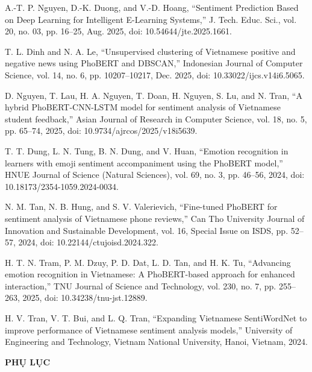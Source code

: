 \documentclass[14pt, a4paper]{report}
\begin{document}
\begin{enumerate}[label={[\arabic*]}]
    \item A.-T. P. Nguyen, D.-K. Duong, and V.-D. Hoang, ``Sentiment Prediction Based on Deep Learning for Intelligent E-Learning Systems,'' J. Tech. Educ. Sci., vol. 20, no. 03, pp. 16--25, Aug. 2025, doi: 10.54644/jte.2025.1661.

    \item T. L. Dinh and N. A. Le, ``Unsupervised clustering of Vietnamese positive and negative news using PhoBERT and DBSCAN,'' Indonesian Journal of Computer Science, vol. 14, no. 6, pp. 10207--10217, Dec. 2025, doi: 10.33022/ijcs.v14i6.5065.

    \item D. Nguyen, T. Lau, H. A. Nguyen, T. Doan, H. Nguyen, S. Lu, and N. Tran, ``A hybrid PhoBERT-CNN-LSTM model for sentiment analysis of Vietnamese student feedback,'' Asian Journal of Research in Computer Science, vol. 18, no. 5, pp. 65--74, 2025, doi: 10.9734/ajrcos/2025/v18i5639.

    \item T. T. Dung, L. N. Tung, B. N. Dung, and V. Huan, ``Emotion recognition in learners with emoji sentiment accompaniment using the PhoBERT model,'' HNUE Journal of Science (Natural Sciences), vol. 69, no. 3, pp. 46--56, 2024, doi: 10.18173/2354-1059.2024-0034.

    \item N. M. Tan, N. B. Hung, and S. V. Valerievich, ``Fine-tuned PhoBERT for sentiment analysis of Vietnamese phone reviews,'' Can Tho University Journal of Innovation and Sustainable Development, vol. 16, Special Issue on ISDS, pp. 52--57, 2024, doi: 10.22144/ctujoisd.2024.322.

    \item H. T. N. Tram, P. M. Dzuy, P. D. Dat, L. D. Tan, and H. K. Tu, ``Advancing emotion recognition in Vietnamese: A PhoBERT-based approach for enhanced interaction,'' TNU Journal of Science and Technology, vol. 230, no. 7, pp. 255--263, 2025, doi: 10.34238/tnu-jst.12889.

    \item H. V. Tran, V. T. Bui, and L. Q. Tran, ``Expanding Vietnamese SentiWordNet to improve performance of Vietnamese sentiment analysis models,'' University of Engineering and Technology, Vietnam National University, Hanoi, Vietnam, 2024.
\end{enumerate}

\medskip\noindent\textbf{\Large PHỤ LỤC}
\end{document}

